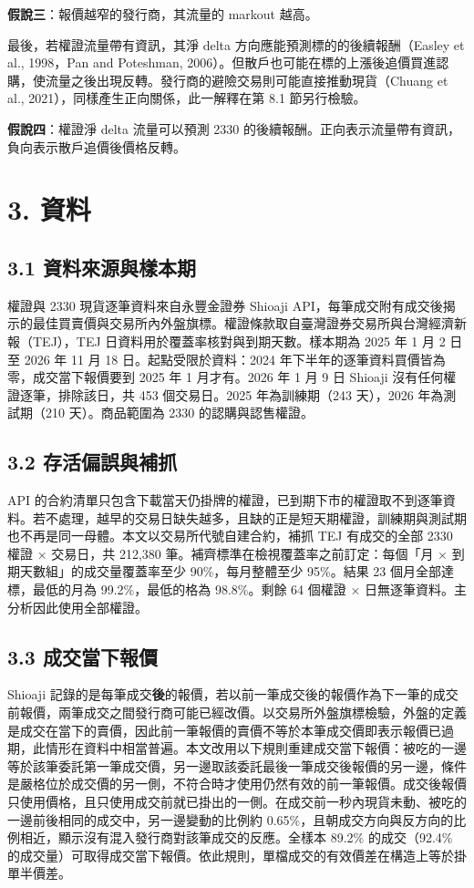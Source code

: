 \documentclass[12pt,a4paper]{article}
\begin{document}
\textbf{假說三}：報價越窄的發行商，其流量的 markout 越高。

最後，若權證流量帶有資訊，其淨 delta 方向應能預測標的的後續報酬（Easley et al., 1998，Pan and Poteshman, 2006）。但散戶也可能在標的上漲後追價買進認購，使流量之後出現反轉。發行商的避險交易則可能直接推動現貨（Chuang et al., 2021），同樣產生正向關係，此一解釋在第 8.1 節另行檢驗。

\textbf{假說四}：權證淨 delta 流量可以預測 2330 的後續報酬。正向表示流量帶有資訊，負向表示散戶追價後價格反轉。


\section*{3. 資料}

\subsection*{3.1 資料來源與樣本期}

權證與 2330 現貨逐筆資料來自永豐金證券 Shioaji API，每筆成交附有成交後揭示的最佳買賣價與交易所內外盤旗標。權證條款取自臺灣證券交易所與台灣經濟新報（TEJ），TEJ 日資料用於覆蓋率核對與到期天數。樣本期為 2025 年 1 月 2 日至 2026 年 11 月 18 日。起點受限於資料：2024 年下半年的逐筆資料買價皆為零，成交當下報價要到 2025 年 1 月才有。2026 年 1 月 9 日 Shioaji 沒有任何權證逐筆，排除該日，共 453 個交易日。2025 年為訓練期（243 天），2026 年為測試期（210 天）。商品範圍為 2330 的認購與認售權證。

\subsection*{3.2 存活偏誤與補抓}

API 的合約清單只包含下載當天仍掛牌的權證，已到期下市的權證取不到逐筆資料。若不處理，越早的交易日缺失越多，且缺的正是短天期權證，訓練期與測試期也不再是同一母體。本文以交易所代號自建合約，補抓 TEJ 有成交的全部 2330 權證 × 交易日，共 212,380 筆。補齊標準在檢視覆蓋率之前訂定：每個「月 × 到期天數組」的成交量覆蓋率至少 90\%，每月整體至少 95\%。結果 23 個月全部達標，最低的月為 99.2\%，最低的格為 98.8\%。剩餘 64 個權證 × 日無逐筆資料。主分析因此使用全部權證。

\subsection*{3.3 成交當下報價}

Shioaji 記錄的是每筆成交\textbf{後}的報價，若以前一筆成交後的報價作為下一筆的成交前報價，兩筆成交之間發行商可能已經改價。以交易所外盤旗標檢驗，外盤的定義是成交在當下的賣價，因此前一筆報價的賣價不等於本筆成交價即表示報價已過期，此情形在資料中相當普遍。本文改用以下規則重建成交當下報價：被吃的一邊等於該筆委託第一筆成交價，另一邊取該委託最後一筆成交後報價的另一邊，條件是嚴格位於成交價的另一側，不符合時才使用仍然有效的前一筆報價。成交後報價只使用價格，且只使用成交前就已掛出的一側。在成交前一秒內現貨未動、被吃的一邊前後相同的成交中，另一邊變動的比例約 0.65\%，且朝成交方向與反方向的比例相近，顯示沒有混入發行商對該筆成交的反應。全樣本 89.2\% 的成交（92.4\% 的成交量）可取得成交當下報價。依此規則，單檔成交的有效價差在構造上等於掛單半價差。
\end{document}
